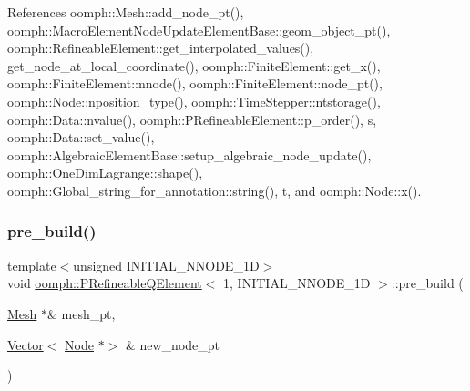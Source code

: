 References oomph\+::\+Mesh\+::add\+\_\+node\+\_\+pt(), oomph\+::\+Macro\+Element\+Node\+Update\+Element\+Base\+::geom\+\_\+object\+\_\+pt(), oomph\+::\+Refineable\+Element\+::get\+\_\+interpolated\+\_\+values(), get\+\_\+node\+\_\+at\+\_\+local\+\_\+coordinate(), oomph\+::\+Finite\+Element\+::get\+\_\+x(), oomph\+::\+Finite\+Element\+::nnode(), oomph\+::\+Finite\+Element\+::node\+\_\+pt(), oomph\+::\+Node\+::nposition\+\_\+type(), oomph\+::\+Time\+Stepper\+::ntstorage(), oomph\+::\+Data\+::nvalue(), oomph\+::\+P\+Refineable\+Element\+::p\+\_\+order(), s, oomph\+::\+Data\+::set\+\_\+value(), oomph\+::\+Algebraic\+Element\+Base\+::setup\+\_\+algebraic\+\_\+node\+\_\+update(), oomph\+::\+One\+Dim\+Lagrange\+::shape(), oomph\+::\+Global\+\_\+string\+\_\+for\+\_\+annotation\+::string(), t, and oomph\+::\+Node\+::x().

\mbox{\label{classoomph_1_1PRefineableQElement_3_011_00_01INITIAL__NNODE__1D_01_4_aa0212960e79620a0d4cefbac9815f859}} 
\subsubsection{\texorpdfstring{pre\+\_\+build()}{pre\_build()}}
{\footnotesize\ttfamily template$<$unsigned I\+N\+I\+T\+I\+A\+L\+\_\+\+N\+N\+O\+D\+E\+\_\+1D$>$ \\
void \hyperlink{classoomph_1_1PRefineableQElement}{oomph\+::\+P\+Refineable\+Q\+Element}$<$ 1, I\+N\+I\+T\+I\+A\+L\+\_\+\+N\+N\+O\+D\+E\+\_\+1D $>$\+::pre\+\_\+build (\begin{DoxyParamCaption}\item[{\hyperlink{classoomph_1_1Mesh}{Mesh} $\ast$\&}]{mesh\+\_\+pt,  }\item[{\hyperlink{classoomph_1_1Vector}{Vector}$<$ \hyperlink{classoomph_1_1Node}{Node} $\ast$$>$ \&}]{new\+\_\+node\+\_\+pt }\end{DoxyParamCaption})\hspace{0.3cm}{\ttfamily [virtual]}}



